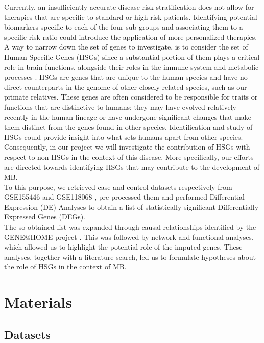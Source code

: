 \documentclass[10pt]{SelfArx} %
\begin{document}
Currently, an insufficiently accurate disease risk stratification does not allow for therapies that are specific to standard or high-risk patients. Identifying potential biomarkers specific to each of the four sub-groups and associating them to a specific risk-ratio could introduce the application of more personalized therapies.\\
A way to narrow down the set of genes to investigate, is to consider the set of Human Specific Genes (HSGs) since a substantial portion of them plays a critical role in brain functions, alongside their roles in the immune system and metabolic processes \cite{bitar2019genes}.
HSGs are genes that are unique to the human species and have no direct counterparts in the genome of other closely related species, such as our primate relatives. These genes are often considered to be responsible for traits or functions that are distinctive to humans; they may have evolved relatively recently in the human lineage or have undergone significant changes that make them distinct from the genes found in other species. Identification and study of HSGs could provide insight into what sets humans apart from other species. \\ 
Consequently, in our project we will investigate the contribution of HSGs with respect to non-HSGs in the context of this disease.
More specifically, our efforts are directed towards identifying HSGs that may contribute to the development of MB. \\ 
To this purpose, we retrieved case and control datasets respectively from GSE155446 \cite{riemondy2022neoplastic} and GSE118068 \cite{vladoiu2019childhood}, pre-processed them and performed Differential Expression (DE) Analyses to obtain a list of statistically significant Differentially Expressed Genes (DEGs). \\
The so obtained list was expanded through causal relationships identified by the GENE@HOME project \cite{asnicar2015tn}. 
This was followed by network and functional analyses, which allowed us to highlight the potential role of the imputed genes. These analyses, together with a literature search, led us to formulate hypotheses about the role of HSGs in the context of MB. \\

\section{Materials}
\subsection{Datasets}\label{sec:Datasets}
\end{document}
